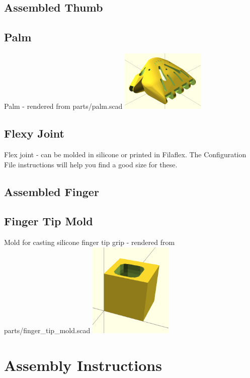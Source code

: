 \documentclass[11pt]{article}
\begin{document}
\hypertarget{thing_thumb\_assembly}{\subsection{Assembled Thumb}}

\hypertarget{thing_palm}{\subsection{Palm}}
Palm - rendered from parts/palm.scad
\includegraphics[width=4cm]{images/palm.png}

\hypertarget{thing_flexy\_joint}{\subsection{Flexy Joint}}
Flex joint - can be molded in silicone or printed in Filaflex. The Configuration File instructions will help you find a good size for these.

\hypertarget{thing_finger\_assembly}{\subsection{Assembled Finger}}

\hypertarget{thing_finger\_tip\_mold}{\subsection{Finger Tip Mold}}
Mold for casting silicone finger tip grip - rendered from parts/finger\_tip\_mold.scad
\includegraphics[width=4cm]{images/finger_tip_mold.png}

\newpage

\section{Assembly Instructions}
\end{document}
